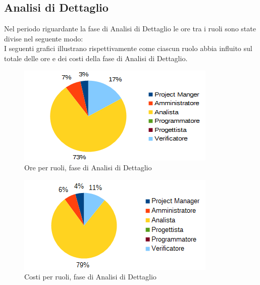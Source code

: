 	\subsection{Analisi di Dettaglio}
	Nel periodo riguardante la fase di Analisi di Dettaglio le ore tra i ruoli sono state divise nel seguente modo: \\
	I seguenti grafici illustrano rispettivamente come ciascun ruolo abbia influito sul totale
delle ore e dei costi della fase di Analisi di Dettaglio.
	\begin{figure}[htbp]
		\centering
		\includegraphics[scale=1]{immagini/grafici/analisi_dettaglio-torta.png}
		\caption{Ore per ruoli, fase di Analisi di Dettaglio}
	\end{figure}
	\begin{figure}[htbp]
		\centering
		\includegraphics[scale=1]{immagini/grafici/analisi_dettaglio-torta-costo.png}
		\caption{Costi per ruoli, fase di Analisi di Dettaglio}
	\end{figure}
